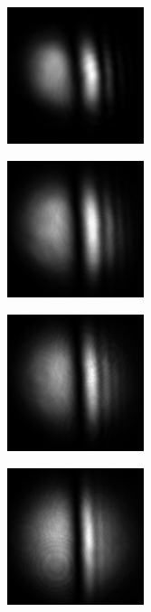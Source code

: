 \begin{figure}[ht]
\begin{subfigure}[b]{4cm}
\includegraphics[width=4cm,keepaspectratio]{interference/figures/move/123-7.png}
\caption{}
\end{subfigure}
\begin{subfigure}[b]{4cm}
\includegraphics[width=4cm,keepaspectratio]{interference/figures/move/123-5.png}
\caption{}
\end{subfigure}
\begin{subfigure}[b]{4cm}
\includegraphics[width=4cm,keepaspectratio]{interference/figures/move/123-3.png}
\caption{}
\end{subfigure}
\begin{subfigure}[b]{4cm}
\includegraphics[width=4cm,keepaspectratio]{interference/figures/move/123-2.png}
\caption{}
\end{subfigure}
\begin{subfigure}[b]{4cm}

\end{subfigure}
\end{figure}
